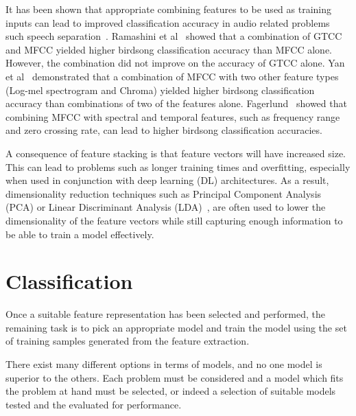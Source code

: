 It has been shown that appropriate combining features to be used as training
inputs can lead to improved classification accuracy in audio related problems
such speech separation~\cite{wang2012exploring}. Ramashini et
al~\cite{ramashini2022robust} showed that a combination of GTCC and MFCC yielded
higher birdsong classification accuracy than MFCC alone. However, the
combination did not improve on the accuracy of GTCC alone. Yan et
al~\cite{yan2021birdsong} demonstrated that a combination of MFCC with two other
feature types (Log-mel spectrogram and Chroma) yielded higher birdsong
classification accuracy than combinations of two of the features alone.
Fagerlund~\cite{fagerlund2007bird} showed that combining MFCC with spectral and
temporal features, such as frequency range and zero crossing rate, can lead to
higher birdsong classification accuracies.

A consequence of feature stacking is that feature vectors will have increased
size. This can lead to problems such as longer training times and overfitting,
especially when used in conjunction with deep learning (DL) architectures. As a
result, dimensionality reduction techniques such as Principal Component
Analysis (PCA) or Linear Discriminant Analysis (LDA)~\cite{ramashini2019bird},
are often used to lower the dimensionality of the feature vectors while still
capturing enough information to be able to train a model effectively.

\section{Classification}

Once a suitable feature representation has been selected and performed, the
remaining task is to pick an appropriate model and train the model using the set
of training samples generated from the feature extraction.

There exist many different options in terms of models, and no one model is
superior to the others. Each problem must be considered and a model which fits
the problem at hand must be selected, or indeed a selection of suitable models
tested and the evaluated for performance.

